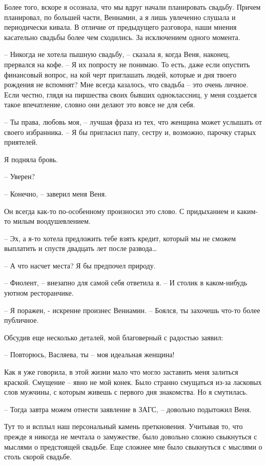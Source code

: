 \documentclass[
]{book}
\begin{document}
Более того, вскоре я осознала, что мы вдруг начали планировать свадьбу. Причем планировал, по большей части, Вениамин, а я лишь увлеченно слушала и периодически кивала. В отличие от предыдущего разговора, наши мнения касательно свадьбы более чем сходились. За исключением одного момента.

-- Никогда не хотела пышную свадьбу, -- сказала я, когда Веня, наконец, прервался на кофе. -- Я их попросту не понимаю. То есть, даже если опустить финансовый вопрос, на кой черт приглашать людей, которые и дня твоего рождения не вспомнят? Мне всегда казалось, что свадьба -- это очень личное. Если честно, глядя на пиршества своих бывших одноклассниц, у меня создается такое впечатление, словно они делают это вовсе не для себя.

-- Ты права, любовь моя, -- лучшая фраза из тех, что женщина может услышать от своего избранника. -- Я бы пригласил папу, сестру и, возможно, парочку старых приятелей.

Я подняла бровь.

-- Уверен?

-- Конечно, -- заверил меня Веня.

Он всегда как-то по-особенному произносил это слово. С придыханием и каким-то милым воодушевлением.

-- Эх, а я-то хотела предложить тебе взять кредит, который мы не сможем выплатить и спустя двадцать лет после развода\ldots{}

-- А что насчет места? Я бы предпочел природу.

-- Фиолент, -- внезапно для самой себя ответила я. -- И столик в каком-нибудь уютном ресторанчике.

-- Я поражен, - искренне произнес Вениамин. -- Боялся, ты захочешь что-то более публичное.

Обсудив еще несколько деталей, мой благоверный с радостью заявил:

-- Повторюсь, Васляева, ты -- моя идеальная женщина!

Как я уже говорила, в этой жизни мало что могло заставить меня залиться краской. Смущение -- явно не мой конек. Было странно смущаться из-за ласковых слов мужчины, с которым живешь с первого дня знакомства. Но я смутилась.

-- Тогда завтра можем отнести заявление в ЗАГС, -- довольно подытожил Веня.

Тут то и всплыл наш персональный камень преткновения. Учитывая то, что прежде я никогда не мечтала о замужестве, было довольно сложно свыкнуться с мыслями о предстоящей свадьбе. Еще сложнее мне было свыкнуться с мыслями о столь скорой свадьбе.
\end{document}
